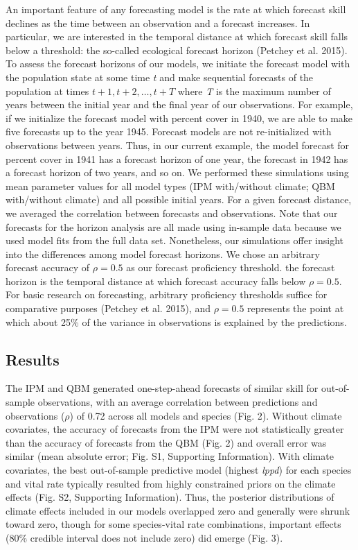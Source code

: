 \documentclass[12pt,]{article}
\begin{document}
An important feature of any forecasting model is the rate at which
forecast skill declines as the time between an observation and a
forecast increases. In particular, we are interested in the temporal
distance at which forecast skill falls below a threshold: the so-called
ecological forecast horizon (Petchey et al. 2015). To assess the
forecast horizons of our models, we initiate the forecast model with the
population state at some time \emph{t} and make sequential forecasts of
the population at times \(t+1, t+2, \dots, t+T\) where \emph{T} is the
maximum number of years between the initial year and the final year of
our observations. For example, if we initialize the forecast model with
percent cover in 1940, we are able to make five forecasts up to the year
1945. Forecast models are not re-initialized with observations between
years. Thus, in our current example, the model forecast for percent
cover in 1941 has a forecast horizon of one year, the forecast in 1942
has a forecast horizon of two years, and so on. We performed these
simulations using mean parameter values for all model types (IPM
with/without climate; QBM with/without climate) and all possible initial
years. For a given forecast distance, we averaged the correlation
between forecasts and observations. Note that our forecasts for the
horizon analysis are all made using in-sample data because we used model
fits from the full data set. Nonetheless, our simulations offer insight
into the differences among model forecast horizons. We chose an
arbitrary forecast accuracy of \(\rho = 0.5\) as our forecast
proficiency threshold. the forecast horizon is the temporal distance at
which forecast accuracy falls below \(\rho = 0.5\). For basic research
on forecasting, arbitrary proficiency thresholds suffice for comparative
purposes (Petchey et al. 2015), and \(\rho = 0.5\) represents the point
at which about 25\% of the variance in observations is explained by the
predictions.

\subsection{Results}\label{results}

The IPM and QBM generated one-step-ahead forecasts of similar skill for
out-of-sample observations, with an average correlation between
predictions and observations (\(\rho\)) of 0.72 across all models and
species (Fig. 2). Without climate covariates, the accuracy of forecasts
from the IPM were not statistically greater than the accuracy of
forecasts from the QBM (Fig. 2) and overall error was similar (mean
absolute error; Fig. S1, Supporting Information). With climate
covariates, the best out-of-sample predictive model (highest
\emph{lppd}) for each species and vital rate typically resulted from
highly constrained priors on the climate effects (Fig. S2, Supporting
Information). Thus, the posterior distributions of climate effects
included in our models overlapped zero and generally were shrunk toward
zero, though for some species-vital rate combinations, important effects
(80\% credible interval does not include zero) did emerge (Fig. 3).
\end{document}
